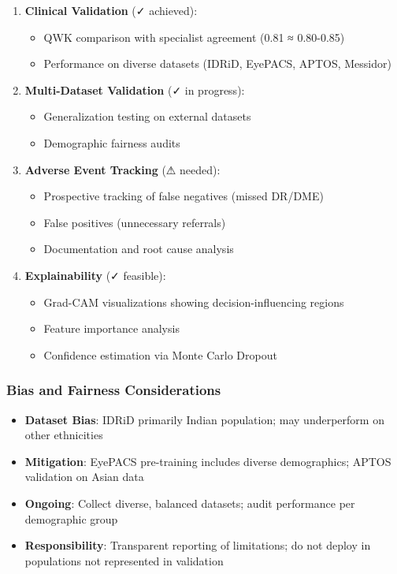 \documentclass[12pt,a4paper]{article}
\begin{document}
\begin{enumerate}
    \item \textbf{Clinical Validation} (✓ achieved):
    \begin{itemize}
        \item QWK comparison with specialist agreement (0.81 ≈ 0.80-0.85)
        \item Performance on diverse datasets (IDRiD, EyePACS, APTOS, Messidor)
    \end{itemize}
    
    \item \textbf{Multi-Dataset Validation} (✓ in progress):
    \begin{itemize}
        \item Generalization testing on external datasets
        \item Demographic fairness audits
    \end{itemize}
    
    \item \textbf{Adverse Event Tracking} (⚠ needed):
    \begin{itemize}
        \item Prospective tracking of false negatives (missed DR/DME)
        \item False positives (unnecessary referrals)
        \item Documentation and root cause analysis
    \end{itemize}
    
    \item \textbf{Explainability} (✓ feasible):
    \begin{itemize}
        \item Grad-CAM visualizations showing decision-influencing regions
        \item Feature importance analysis
        \item Confidence estimation via Monte Carlo Dropout
    \end{itemize}
\end{enumerate}

\subsubsection{Bias and Fairness Considerations}

\begin{itemize}
    \item \textbf{Dataset Bias}: IDRiD primarily Indian population; may underperform on other ethnicities
    \item \textbf{Mitigation}: EyePACS pre-training includes diverse demographics; APTOS validation on Asian data
    \item \textbf{Ongoing}: Collect diverse, balanced datasets; audit performance per demographic group
    \item \textbf{Responsibility}: Transparent reporting of limitations; do not deploy in populations not represented in validation
\end{itemize}
\end{document}

